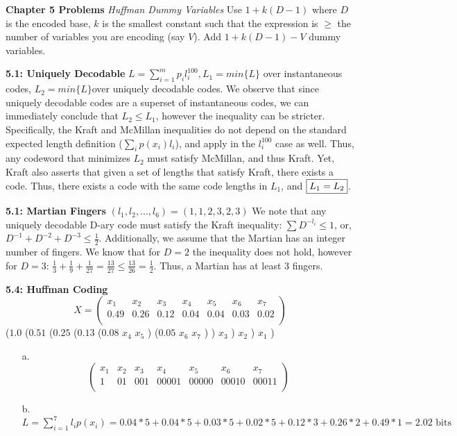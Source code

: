 \documentclass[10pt]{article}
\begin{document}
\begin{tiny}
\begin{multicols}{3}
\textbf{\scriptsize Chapter 5 Problems}
\textit{Huffman Dummy Variables}
Use $1+k(D-1)$ where $D$ is the encoded base, $k$ is the smallest constant such that the expression is $\geq$ the number of variables you are encoding (say $V$). Add $1+k(D-1) - V$ dummy variables.

\textbf{5.1: Uniquely Decodable}
$L = \sum_{i=1}^m p_i l_i^{100}, L_1 = min\{L\}$ over instantaneous codes, $L_2 = min\{L\} $over uniquely decodable codes. We observe that since uniquely decodable codes are a superset of instantaneous codes, we can immediately conclude that $L_2 \leq L_1$, however the inequality can be stricter. Specifically, the Kraft and McMillan inequalities do not depend on the standard expected length definition ($\sum_i p(x_i)l_i$), and apply in the $l_i^{100}$ case as well. Thus, any codeword that minimizes $L_2$ must satisfy McMillan, and thus Kraft. Yet, Kraft also asserts that given a set of lengths that satisfy Kraft, there exists a code. Thus, there exists a code with the same code lengths in $L_1$, and $\fbox{$L_1 = L_2$}$.

\textbf{5.1: Martian Fingers}
$(l_1,l_2,...,l_6) = (1,1,2,3,2,3)$ We note that any uniquely decodable D-ary code must satisfy the Kraft inequality: $\sum D^{-l_i} \leq 1$, or, $D^{-1} + D^{-2} + D^{-3} \leq \frac{1}{2}$. Additionally, we assume that the Martian has an integer number of fingers. We know that for $D=2$ the inequality does not hold, however for $D=3$: $\frac{1}{3} + \frac{1}{9} + \frac{1}{27} = \frac{13}{27} \leq  \frac{13}{26} = \frac{1}{2}$. Thus, a Martian has at least $3$ fingers.

\textbf{5.4: Huffman Coding}
\[
 X =
 \begin{pmatrix}
	x_1 & x_2 & x_3 & x_4 & x_5 & x_6 & x_7 \\
	0.49 & 0.26 & 0.12 & 0.04 & 0.04 & 0.03 & 0.02 \\
 \end{pmatrix}
\]
($1.0$ ($0.51$ ($0.25$ ($0.13$ ($0.08$ $x_4$ $x_5$ ) ($0.05$ $x_6$ $x_7$ ) ) $x_3$ ) $x_2$ ) $x_1$ )
\begin{itemize}
	\item[a.] 
\[
 \begin{pmatrix}
	x_1 & x_2 & x_3 & x_4   & x_5   & x_6   & x_7 \\
	1   & 01  & 001 & 00001 & 00000 & 00010 & 00011 \\
 \end{pmatrix}
\]
	\item[b.] $L = \sum_{i=1}^7 l_i p(x_i) = 0.04*5 + 0.04*5 + 0.03*5 + 0.02*5 + 0.12*3 + 0.26*2 + 0.49*1 = 2.02\textrm{ bits}$


\end{itemize}
\end{multicols}
\end{tiny}
\end{document}
